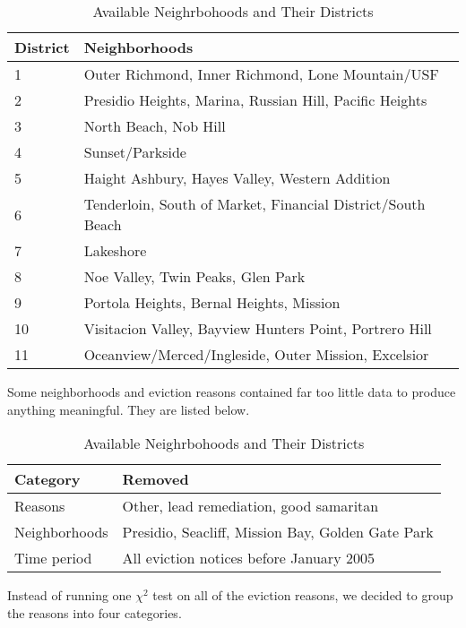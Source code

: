\documentclass[]{article}
\begin{document}
\begin{table}[!h]
\begin{tabular}{l | l}
District & Neighborhoods \\
\hline
1 		 & Outer Richmond, Inner Richmond, Lone Mountain/USF \\
2		 & Presidio Heights, Marina, Russian Hill, Pacific Heights \\
3 		 & North Beach, Nob Hill \\
4		 & Sunset/Parkside \\
5		 & Haight Ashbury, Hayes Valley, Western Addition \\
6		 & Tenderloin, South of Market, Financial District/South Beach \\
7		 & Lakeshore \\
8 		 & Noe Valley, Twin Peaks, Glen Park \\
9		 & Portola Heights, Bernal Heights, Mission \\
10 		 & Visitacion Valley, Bayview Hunters Point, Portrero Hill \\
11		 & Oceanview/Merced/Ingleside, Outer Mission, Excelsior \\
\end{tabular}
\caption{Available Neighrbohoods and Their Districts}
\end{table}

Some neighborhoods and eviction reasons contained far too little data to produce anything meaningful. They are listed below.

\begin{table}[!h]
\begin{tabular}{l | l}
Category & Removed \\\hline
Reasons  & Other, lead remediation, good samaritan \\
Neighborhoods & Presidio, Seacliff, Mission Bay, Golden Gate Park \\
Time period & All eviction notices before January 2005 \\
\end{tabular}
\caption{Available Neighrbohoods and Their Districts}
\end{table}
\newpage
Instead of running one $\chi ^{2}$ test on all of the eviction reasons, we decided to group the reasons into four categories.
\end{document}
